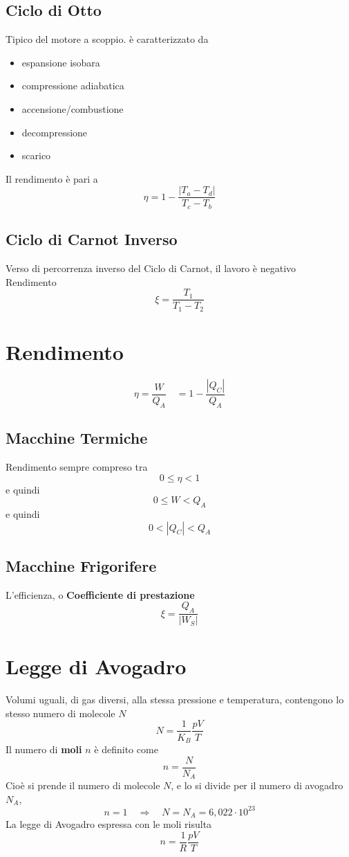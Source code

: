 \documentclass[a4paper]{report}
\begin{document}
  \subsection{Ciclo di Otto}
  Tipico del motore a scoppio. è caratterizzato da
  \begin{itemize}
    \item espansione isobara
    \item compressione adiabatica
    \item accensione/combustione
    \item decompressione
    \item scarico
  \end{itemize}
  Il rendimento è pari a
  \[ \eta = 1 - \frac{|T_a - T_d|}{T_c - T_b} \]

  \subsection{Ciclo di Carnot Inverso}
  Verso di percorrenza inverso del Ciclo di Carnot, il lavoro è negativo \\
  Rendimento
  \[ \xi = \frac{T_1}{T_1 - T_2} \]



  \section{Rendimento}
  \[ \eta=\frac{W}{Q_A} \quad = 1- \frac{|Q_C|}{Q_A}\]
  \subsection{Macchine Termiche}
  Rendimento sempre compreso tra
  \[0 \leq \eta < 1\]
  e quindi
  \[0 \leq W < Q_A \]
  e quindi
  \[ 0 < |Q_C| < Q_A \]
  \subsection {Macchine Frigorifere}
  L'efficienza, o \textbf{Coefficiente di prestazione}
  \[ \xi = \frac{Q_A}{|W_S|}  \]

  \section{Legge di Avogadro}
  Volumi uguali, di gas diversi, alla stessa pressione e temperatura, contengono lo stesso numero di molecole $N$
  \[ N = \frac{1}{K_B} \frac{pV}{T} \]
  Il numero di \textbf{moli} $n$ è definito come
  \[ n = \frac{N}{N_A} \]
  Cioè si prende il numero di molecole $N$, e lo si divide per il numero di avogadro $N_A$,
  \[ n = 1 \quad \Rightarrow \quad N = N_A = 6,022 \cdot 10^{23}\]
  La legge di Avogadro espressa con le moli risulta
  \[ n = \frac{1}{R} \frac{pV}{T} \]
\end{document}
